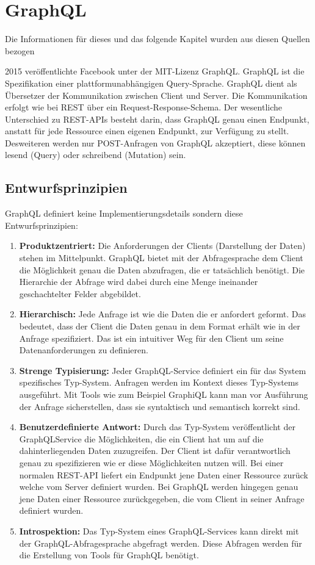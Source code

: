 \section{GraphQL}
Die Informationen für dieses und das folgende Kapitel wurden aus diesen Quellen bezogen \cite{kress2020graphql, graphqlOnline, dgraphOnline, rakutenGraphQLVsRest}
\newline


2015 veröffentlichte Facebook unter der MIT-Lizenz GraphQL. GraphQL ist die Spezifikation einer plattformunabhängigen Query-Sprache. GraphQL dient als Übersetzer der Kommunikation zwischen Client und Server.
Die Kommunikation erfolgt wie bei REST über ein Request-Response-Schema.
Der wesentliche Unterschied zu REST-APIs besteht darin, dass GraphQL genau einen Endpunkt, anstatt für jede Ressource einen eigenen Endpunkt, zur Verfügung zu stellt.
Desweiteren werden nur POST-Anfragen von GraphQL akzeptiert, diese können lesend (Query) oder schreibend (Mutation) sein.

\subsection{Entwurfsprinzipien}
GraphQL definiert keine Implementierungsdetails sondern diese Entwurfsprinzipien:
\begin{enumerate}
    \item \textbf{Produktzentriert:}
    Die Anforderungen der Clients (Darstellung der Daten) stehen im Mittelpunkt. GraphQL bietet mit der Abfragesprache dem Client die Möglichkeit genau die Daten abzufragen, die er tatsächlich benötigt. Die Hierarchie der
    Abfrage wird dabei durch eine Menge ineinander geschachtelter Felder abgebildet.
    \item \textbf{Hierarchisch:}
    Jede Anfrage ist wie die Daten die er anfordert geformt.
    Das bedeutet, dass der Client die Daten genau in dem Format erhält wie in der Anfrage spezifiziert. Das ist ein intuitiver Weg für den Client um seine Datenanforderungen zu definieren.
    \item \textbf{Strenge Typisierung:}
    Jeder GraphQL-Service definiert ein für das System spezifisches Typ-System. Anfragen werden im Kontext dieses Typ-Systems ausgeführt.
    Mit Tools wie zum Beispiel GraphiQL kann man vor Ausführung der Anfrage sicherstellen, dass sie syntaktisch und semantisch korrekt sind.
    \item \textbf{Benutzerdefinierte Antwort:}
    Durch das Typ-System veröffentlicht der GraphQLService die Möglichkeiten, die ein Client hat um auf die dahinterliegenden Daten zuzugreifen.
    Der Client ist dafür verantwortlich genau zu spezifizieren wie er diese Möglichkeiten nutzen will.
    Bei einer normalen REST-API liefert ein Endpunkt jene Daten einer Ressource zurück welche vom Server definiert wurden.
    Bei GraphQL werden hingegen genau jene Daten einer Ressource zurückgegeben, die vom Client in seiner Anfrage definiert wurden.
    \item \textbf{Introspektion:}
    Das Typ-System eines GraphQL-Services kann direkt mit der GraphQL-Abfragesprache abgefragt werden. Diese Abfragen werden für die Erstellung von Tools für GraphQL benötigt.
\end{enumerate}

